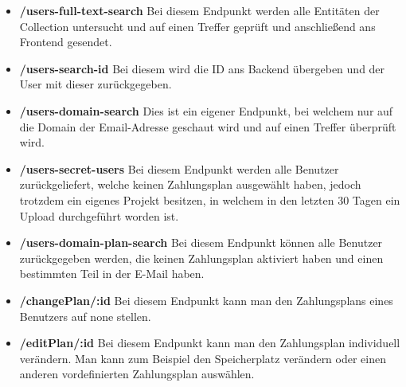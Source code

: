 \begin{itemize}
    \item \textbf{/users-full-text-search}
        \newline
        Bei diesem Endpunkt werden alle Entitäten der Collection untersucht und auf einen Treffer geprüft und anschließend ans Frontend gesendet.
    \item \textbf{/users-search-id}
        \newline
        Bei diesem wird die ID ans Backend übergeben und der User mit dieser zurückgegeben.
    \item \textbf{/users-domain-search}
        \newline
        Dies ist ein eigener Endpunkt, bei welchem nur auf die Domain der Email-Adresse geschaut wird und auf einen Treffer überprüft wird.
    \item \textbf{/users-secret-users}
        \newline
        Bei diesem Endpunkt werden alle Benutzer zurückgeliefert, welche keinen Zahlungsplan ausgewählt haben, jedoch trotzdem ein eigenes Projekt besitzen, in welchem in den letzten 30 Tagen ein Upload durchgeführt worden ist.
    \item \textbf{/users-domain-plan-search}
        \newline
        Bei diesem Endpunkt können alle Benutzer zurückgegeben werden, die keinen Zahlungsplan aktiviert haben und einen bestimmten Teil in der E-Mail haben.
    \item \textbf{/changePlan/:id}
        \newline
        Bei diesem Endpunkt kann man den Zahlungsplans eines Benutzers auf none stellen.
    \item \textbf{/editPlan/:id}
        \newline
        Bei diesem Endpunkt kann man den Zahlungsplan individuell verändern. Man kann zum Beispiel den Speicherplatz verändern oder einen anderen vordefinierten Zahlungsplan auswählen.
\end{itemize}